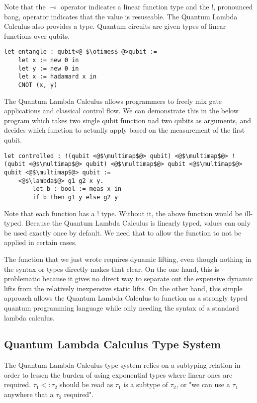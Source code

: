 Note that the $\multimap$ operator indicates a linear function type and the $!$, pronounced bang, operator indicates that the value is resuseable.
The Quantum Lambda Calculus also provides a  type.
Quantum circuits are given types of linear functions over qubits.

\begin{lstlisting}[style=customcoq]
let entangle : qubit<@ $\otimes$ @>qubit :=
    let x := new 0 in
    let y := new 0 in
    let x := hadamard x in
    CNOT (x, y)
\end{lstlisting}

The Quantum Lambda Calculus allows programmers to freely mix gate applications and classical control flow.
We can demonstrate this in the below program which takes two single qubit function nad two qubits as arguments, and decides which function to actually apply based on the measurement of the first qubit.
\begin{lstlisting}[style=customcoq]
let controlled : !(qubit <@$\multimap$@> qubit) <@$\multimap$@> !(qubit <@$\multimap$@> qubit) <@$\multimap$@> qubit <@$\multimap$@> qubit <@$\multimap$@> qubit :=
    <@$\lambda$@> g1 g2 x y.
        let b : bool := meas x in
        if b then g1 y else g2 y
\end{lstlisting}
Note that each function has a $!$ type.
Without it, the above function would be ill-typed.
Because the Quantum Lambda Calculus is linearly typed, values can only be used exactly once by default.
We need that to allow the function to not be applied in certain cases.

The function that we just wrote requires dynamic lifting, even though nothing in the syntax or types directly makes that clear.
On the one hand, this is problematic because it gives no direct way to separate out the expensive dynamic lifts from the relatively inexpensive static lifts.
On the other hand, this simple approach allows the Quantum Lambda Calculus to function as a strongly typed quantum programming language while only needing the syntax of a standard lambda calculus.


\subsection{Quantum Lambda Calculus Type System}
The Quantum Lambda Calculus type system relies on a subtyping relation in order to lessen the burden of using exponential types where linear ones are required.
$\tau_1 <: \tau_2$ should be read as $\tau_1$ is a subtype of $\tau_2$, or "we can use a $\tau_1$ anywhere that a $\tau_2$ required".

